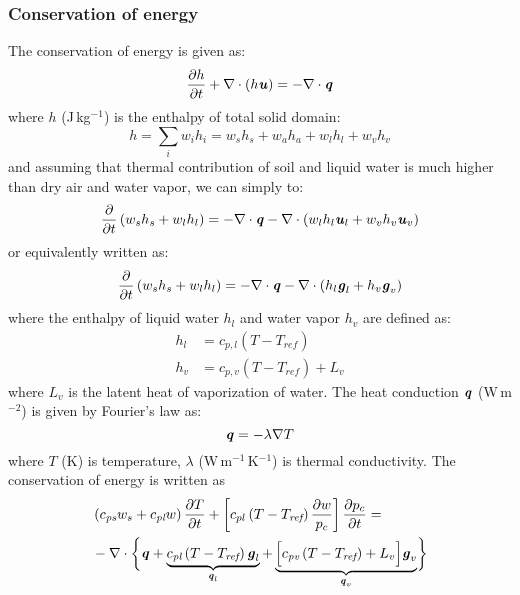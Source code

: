 \subsubsection*{Conservation of energy}
The conservation of energy is given as:
\begin{equation}
\frac{\partial h}{\partial t} + \nabla \cdot \left(h \textbf{\textit{u}}\right) = - \nabla \cdot \textbf{\textit{q}}
\end{equation}
where $h$ (J\,kg$^{-1}$) is the enthalpy of total solid domain:
\begin{equation}
h = \sum_i w_i h_i = w_s h_s + w_a h_a + w_l h_l + w_v h_v
\end{equation}
and assuming that thermal contribution of soil and liquid water is much higher than dry air and water vapor, we can simply to:
\begin{equation}
\frac{\partial}{\partial t}\left(w_s h_s + w_l h_l\right) = - \nabla \cdot \textbf{\textit{q}} - \nabla \cdot \left(w_l h_l \textbf{\textit{u}}_l + w_v h_v \textbf{\textit{u}}_v\right)
\end{equation}
or equivalently written as:
\begin{equation}
\frac{\partial}{\partial t}\left(w_s h_s + w_l h_l\right) = - \nabla \cdot \textbf{\textit{q}} - \nabla \cdot \left(h_l \textbf{\textit{g}}_l + h_v \textbf{\textit{g}}_v\right)
\end{equation}
where the enthalpy of liquid water $h_l$ and water vapor $h_v$ are defined as:
\begin{align}
h_l &= c_{p,l} \left(T - T_{\textit{ref}}\right)\\
h_v &= c_{p,v} \left(T - T_{\textit{ref}}\right) + L_v
\end{align}
where $L_v$ is the latent heat of vaporization of water. The heat conduction $\textbf{\textit{q}}$ (W\,m$^{-2}$) is given by Fourier's law as:
\begin{equation}
\textbf{\textit{q}} = -\lambda \nabla T
\end{equation}
where $T$ (K) is temperature, $\lambda$ (W\,m$^{-1}$\,K$^{-1}$) is thermal conductivity. The conservation of energy is written as  
\begin{equation}
\begin{split}
&\left(c_{\textit{ps}} w_s + c_{\textit{pl}} w\right)\frac{\partial T}{\partial t} + \left[c_{pl} \left(T - T_{\textit{ref}}\right) \frac{\partial w}{p_c}\right]\frac{\partial p_c}{\partial t} =\\
& - \nabla \cdot \bigg\{ {\textbf{\textit{q}} + \underbrace{ c_{\textit{pl}} \left(T - T_{\textit{ref}}\right)\textbf{\textit{g}}_l}_{\textbf{\textit{q}}_l} + \underbrace{ \Big[c_{\textit{pv}} \left(T - T_{\textit{ref}}\right) + L_v\Big]\textbf{\textit{g}}_v}_{\textbf{\textit{q}}_v} } \bigg\}
\end{split}
\end{equation}

